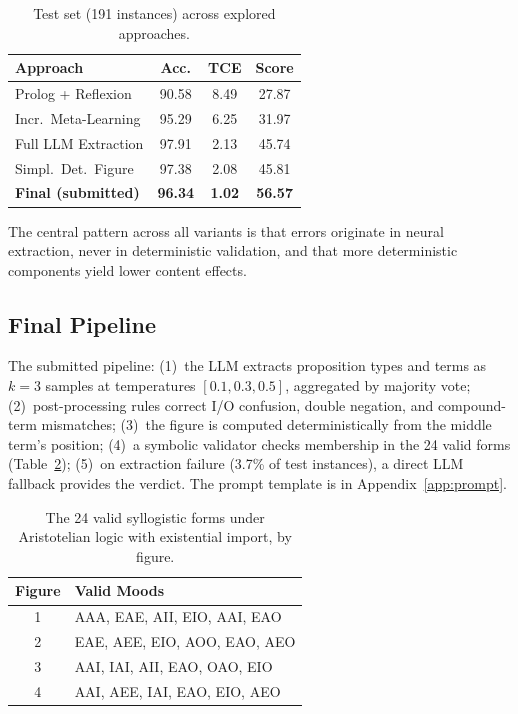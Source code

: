 \documentclass[11pt]{article}
\begin{document}
\begin{table}[t]
\centering
\small
\begin{tabular}{@{}lccc@{}}
\toprule
\textbf{Approach} & \textbf{Acc.} & \textbf{TCE} & \textbf{Score} \\
\midrule
Prolog + Reflexion & 90.58 & 8.49 & 27.87 \\
Incr.\ Meta-Learning & 95.29 & 6.25 & 31.97 \\
Full LLM Extraction & 97.91 & 2.13 & 45.74 \\
Simpl.\ Det.\ Figure & 97.38 & 2.08 & 45.81 \\
\textbf{Final (submitted)} & \textbf{96.34} & \textbf{1.02} & \textbf{56.57} \\
\bottomrule
\end{tabular}
\caption{Test set (191 instances) across explored approaches.}
\label{tab:approach-comparison}
\end{table}

The central pattern across all variants is that errors originate in neural extraction, never in deterministic validation, and that more deterministic components yield lower content effects.

\subsection{Final Pipeline}

The submitted pipeline: (1)~the LLM extracts proposition types and terms as $k=3$ samples at temperatures $[0.1, 0.3, 0.5]$, aggregated by majority vote; (2)~post-processing rules correct I/O confusion, double negation, and compound-term mismatches; (3)~the figure is computed deterministically from the middle term's position; (4)~a symbolic validator checks membership in the 24 valid forms (Table~\ref{tab:valid_forms}); (5)~on extraction failure (3.7\% of test instances), a direct LLM fallback provides the verdict. The prompt template is in Appendix~\ref{app:prompt}.

\begin{table}[t]
\centering
\small
\begin{tabular}{@{}cl@{}}
\toprule
\textbf{Figure} & \textbf{Valid Moods} \\
\midrule
1 & AAA, EAE, AII, EIO, AAI, EAO \\
2 & EAE, AEE, EIO, AOO, EAO, AEO \\
3 & AAI, IAI, AII, EAO, OAO, EIO \\
4 & AAI, AEE, IAI, EAO, EIO, AEO \\
\bottomrule
\end{tabular}
\caption{The 24 valid syllogistic forms under Aristotelian logic with existential import, by figure.}
\label{tab:valid_forms}
\end{table}
\end{document}
